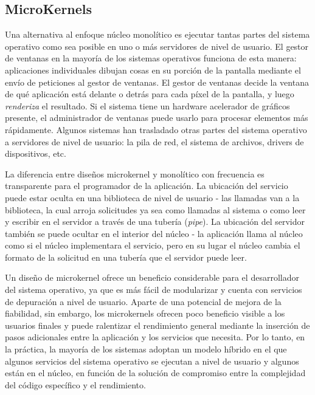 \documentclass[10pt]{book}
\begin{document}
\subsection{MicroKernels}
Una alternativa al enfoque núcleo monolítico es ejecutar tantas partes del sistema operativo como sea posible en uno o más servidores de nivel de usuario. El gestor de ventanas en la mayoría de los sistemas operativos funciona de esta manera: aplicaciones individuales dibujan cosas en su porción de la pantalla mediante el envío de peticiones al gestor de ventanas. El gestor de ventanas decide la ventana de qué aplicación está delante o detrás para cada píxel de la pantalla, y luego \textit{renderiza} el resultado. Si el sistema tiene un hardware acelerador de gráficos presente, el administrador de ventanas puede usarlo para procesar elementos más rápidamente. Algunos sistemas han trasladado otras partes del sistema operativo a servidores de nivel de usuario: la pila de red, el sistema de archivos, drivers de dispositivos, etc.

La diferencia entre diseños microkernel y monolítico con frecuencia es transparente para el programador de la aplicación. La ubicación del servicio puede estar oculta en una biblioteca de nivel de usuario - las llamadas van a la biblioteca, la cual arroja solicitudes ya sea como llamadas al sistema o como leer y escribir en el servidor a través de una tubería (\textit{pipe}). La ubicación del servidor también se puede ocultar en el interior del núcleo - la aplicación llama al núcleo como si el núcleo implementara el servicio, pero en su lugar el núcleo cambia el formato de la solicitud en una tubería que el servidor puede leer.

Un diseño de microkernel ofrece un beneficio considerable para el desarrollador del sistema operativo, ya que es más fácil de modularizar y cuenta con servicios de depuración a nivel de usuario. Aparte de una potencial de mejora de la fiabilidad, sin embargo, los microkernels ofrecen poco beneficio visible a los usuarios finales y puede ralentizar el rendimiento general mediante la inserción de pasos adicionales entre la aplicación y los servicios que necesita. Por lo tanto, en la práctica, la mayoría de los sistemas adoptan un modelo híbrido en el que algunos servicios del sistema operativo se ejecutan a nivel de usuario y algunos están en el núcleo, en función de la solución de compromiso entre la complejidad del código específico y el rendimiento.
\end{document}
